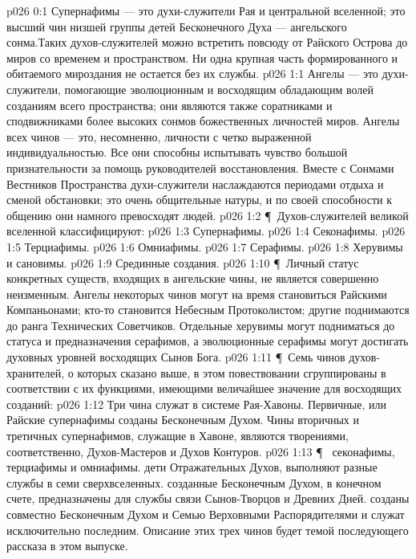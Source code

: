 \vs p026 0:1 Супернафимы --- это духи\hyp{}служители Рая и центральной вселенной; это высший чин низшей группы детей Бесконечного Духа --- ангельского сонма.Таких духов\hyp{}служителей можно встретить повсюду от Райского Острова до миров со временем и пространством. Ни одна крупная часть формированного и обитаемого мироздания не остается без их службы.
\vs p026 1:1 Ангелы --- это духи\hyp{}служители, помогающие эволюционным и восходящим обладающим волей созданиям всего пространства; они являются также соратниками и сподвижниками более высоких сонмов божественных личностей миров. Ангелы всех чинов --- это, несомненно, личности с четко выраженной индивидуальностью. Все они способны испытывать чувство большой признательности за помощь руководителей восстановления. Вместе с Сонмами Вестников Пространства духи\hyp{}служители наслаждаются периодами отдыха и сменой обстановки; это очень общительные натуры, и по своей способности к общению они намного превосходят людей.
\vs p026 1:2 \P\ Духов\hyp{}служителей великой вселенной классифицируют:
\vs p026 1:3 \bibnobreakspace Супернафимы.
\vs p026 1:4 \bibnobreakspace Секонафимы.
\vs p026 1:5 \bibnobreakspace Терциафимы.
\vs p026 1:6 \bibnobreakspace Омниафимы.
\vs p026 1:7 \bibnobreakspace Серафимы.
\vs p026 1:8 \bibnobreakspace Херувимы и сановимы.
\vs p026 1:9 \bibnobreakspace Срединные создания.
\vs p026 1:10 \P\ Личный статус конкретных существ, входящих в ангельские чины, не является совершенно неизменным. Ангелы некоторых чинов могут на время становиться Райскими Компаньонами; кто\hyp{}то становится Небесным Протоколистом; другие поднимаются до ранга Технических Советчиков. Отдельные херувимы могут подниматься до статуса и предназначения серафимов, а эволюционные серафимы могут достигать духовных уровней восходящих Сынов Бога.
\vs p026 1:11 \P\ Семь чинов духов\hyp{}хранителей, о которых сказано выше, в этом повествовании сгруппированы в соответствии с их функциями, имеющими величайшее значение для восходящих созданий:
\vs p026 1:12 \bibnobreakspace {} Три чина  служат в системе Рая\hyp{}Хавоны. Первичные, или Райские супернафимы созданы Бесконечным Духом. Чины вторичных и третичных супернафимов, служащие в Хавоне, являются творениями, соответственно, Духов\hyp{}Мастеров и Духов Контуров.
\vs p026 1:13 \P\ \bibnobreakspace {} секонафимы, терциафимы и омниафимы.  дети Отражательных Духов, выполняют разные службы в семи сверхвселенных.  созданные Бесконечным Духом, в конечном счете, предназначены для службы связи Сынов\hyp{}Творцов и Древних Дней.  созданы совместно Бесконечным Духом и Семью Верховными Распорядителями и служат исключительно последним. Описание этих трех чинов будет темой последующего рассказа в этом выпуске.
